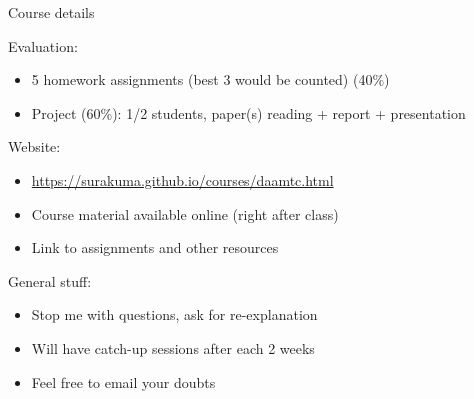 \documentclass[
	12pt, %
]{beamer}
\newcommand{\brown}[1]{{\color{brown} #1 }}
\begin{document}
\begin{frame}{Course details}

\brown{Evaluation:}
\begin{itemize}
	\item 5 homework assignments (best 3 would be counted) (40\%)
	\item Project (60\%): 1/2 students, paper(s) reading + report + presentation
\end{itemize}
\vfill
\brown{Website:}
\begin{itemize}
	\item \url{https://surakuma.github.io/courses/daamtc.html}
	\item Course material available online (right after class)
	\item Link to assignments and other resources
\end{itemize}
\vfill
\brown{General stuff:}
\begin{itemize}
	\item Stop me with questions, ask for re-explanation
	\item Will have catch-up sessions after each 2 weeks
	\item Feel free to email your doubts
\end{itemize}


\end{frame}
\end{document}
